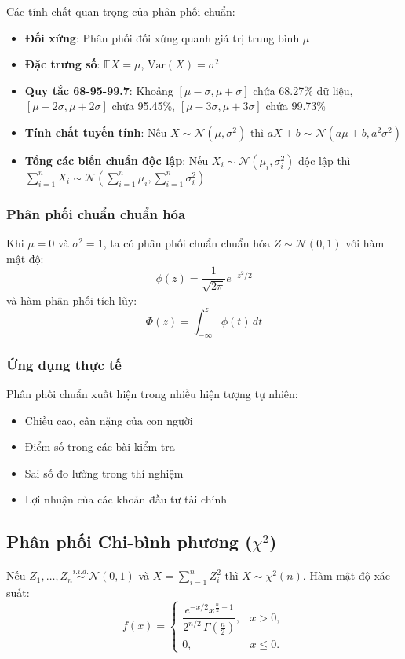 \begin{tinhchat}
Các tính chất quan trọng của phân phối chuẩn:
\begin{itemize}
    \item \textbf{Đối xứng}: Phân phối đối xứng quanh giá trị trung bình $\mu$
    \item \textbf{Đặc trưng số}: $\mathbb{E}X=\mu$, $\text{Var}(X)=\sigma^2$
    \item \textbf{Quy tắc 68-95-99.7}: Khoảng $[\mu-\sigma, \mu+\sigma]$ chứa 68.27\% dữ liệu, $[\mu-2\sigma, \mu+2\sigma]$ chứa 95.45\%, $[\mu-3\sigma, \mu+3\sigma]$ chứa 99.73\%
    \item \textbf{Tính chất tuyến tính}: Nếu $X\sim\mathcal{N}(\mu,\sigma^2)$ thì $aX+b\sim\mathcal{N}(a\mu+b, a^2\sigma^2)$
    \item \textbf{Tổng các biến chuẩn độc lập}: Nếu $X_i\sim\mathcal{N}(\mu_i,\sigma_i^2)$ độc lập thì $\sum_{i=1}^n X_i\sim\mathcal{N}(\sum_{i=1}^n \mu_i, \sum_{i=1}^n \sigma_i^2)$
\end{itemize}
\end{tinhchat}

\subsubsection*{Phân phối chuẩn chuẩn hóa}
Khi $\mu=0$ và $\sigma^2=1$, ta có phân phối chuẩn chuẩn hóa $Z\sim\mathcal{N}(0,1)$ với hàm mật độ:
\[
\phi(z)=\frac{1}{\sqrt{2\pi}}e^{-z^2/2}
\]
và hàm phân phối tích lũy:
\[
\Phi(z)=\int_{-\infty}^z \phi(t)\,dt
\]

\subsubsection*{Ứng dụng thực tế}
Phân phối chuẩn xuất hiện trong nhiều hiện tượng tự nhiên:
\begin{itemize}
    \item Chiều cao, cân nặng của con người
    \item Điểm số trong các bài kiểm tra
    \item Sai số đo lường trong thí nghiệm
    \item Lợi nhuận của các khoản đầu tư tài chính
\end{itemize}

\subsection{Phân phối Chi-bình phương ($\chi^2$)}
\begin{dn}
Nếu $Z_1,\ldots,Z_n\overset{i.i.d.}{\sim}\mathcal{N}(0,1)$ và $X=\sum_{i=1}^n Z_i^2$ thì $X\sim\chi^2(n)$. Hàm mật độ xác suất:
\[
f(x)=\begin{cases}\dfrac{e^{-x/2}x^{\frac{n}{2}-1}}{2^{n/2}\,\Gamma\!\left(\tfrac{n}{2}\right)}, & x>0,\\ 0, & x\le0.\end{cases}
\]
\end{dn}

